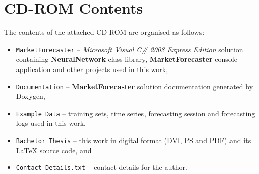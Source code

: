 \chapter{CD-ROM Contents}

The contents of the attached CD-ROM are organised as follows:

\begin{itemize}
\item \texttt{MarketForecaster} -- \textit{Microsoft Visual C\# 2008 Express Edition} solution containing \textbf{NeuralNetwork} class library, \textbf{MarketForecaster} console application and other projects used in this work,
\item \texttt{Documentation} -- \textbf{MarketForecaster} solution documentation generated by Doxygen,
\item \texttt{Example Data} -- training sets, time series, forecasting session and forecasting logs used in this work,
\item \texttt{Bachelor Thesis} -- this work in digital format (DVI, PS and PDF) and its \LaTeX{} source code, and
\item \texttt{Contact Details.txt} -- contact details for the author.
\end{itemize}